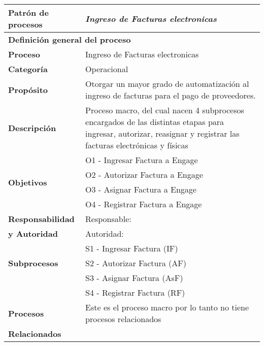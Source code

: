 \begin{longtable}{|llrrrrrr|}
	\hline
	\multicolumn{2}{|l|}{\textbf{Patrón de procesos}} & \multicolumn{6}{|l|}{\textit{Ingreso de Facturas electronicas}} \\ \hline
	\multicolumn{8}{|l|}{\textbf{Definición general del proceso}} \\ \hline
	\textbf{Proceso} & \multicolumn{7}{|m{12cm}|}{Ingreso de Facturas electronicas} \\ \hline
	\textbf{Categoría} & \multicolumn{7}{|m{12cm}|}{Operacional} \\ \hline
	\textbf{Propósito} & \multicolumn{7}{|m{12cm}|}{Otorgar un mayor grado de automatización al ingreso de facturas para el pago de proveedores.} \\ \hline
    \textbf{Descripción} & \multicolumn{7}{|m{12cm}|}{Proceso macro, del cual nacen 4 subprocesos encargados de las distintas etapas para ingresar, autorizar, reasignar y registrar las facturas electrónicas y físicas} \\ \hline
	\multirow{4}[6]{*}{\textbf{Objetivos}} 
		  & \multicolumn{7}{|l|}{O1 - Ingresar Factura a Engage} \\ \cline{2-8}
          & \multicolumn{7}{|l|}{O2 - Autorizar Factura a Engage} \\ \cline{2-8}
          & \multicolumn{7}{|l|}{O3 - Asignar Factura a Engage} \\ \hline
          & \multicolumn{7}{|l|}{O4 - Registrar Factura a Engage} \\ \hline
    \multicolumn{1}{|l|}{\textbf{Responsabilidad}} 	& \multicolumn{7}{|l|}{Responsable: } \\
	\multicolumn{1}{|l|}{\textbf{y Autoridad}} 	& \multicolumn{7}{|l|}{Autoridad: } \\ \hline
	\multirow{3}[4]{*}{\textbf{Subprocesos}} 
		  & \multicolumn{7}{|l|}{S1 - Ingresar Factura (IF)} \\  \cline{2-8} 
	      & \multicolumn{7}{|l|}{S2 - Autorizar Factura (AF)} \\  \cline{2-8} 
	      & \multicolumn{7}{|l|}{S3 - Asignar Factura (AsF)} \\ \cline{2-8}
	      & \multicolumn{7}{|l|}{S4 - Registrar Factura (RF)} \\ \hline
    \multicolumn{1}{|l|}{\textbf{Procesos}} 	& \multicolumn{7}{|l|}{Este es el proceso macro por lo tanto no tiene procesos relacionados} \\
	\multicolumn{1}{|l|}{\textbf{Relacionados}} 	&  \multicolumn{7}{|l|}{} \\ \hline

\end{longtable}
